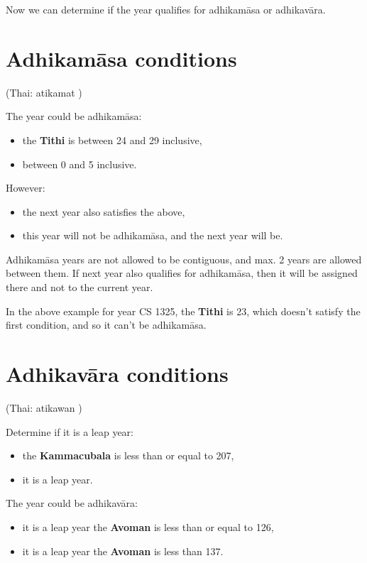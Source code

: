 \documentclass[11pt,oneside]{memoir-article}
\begin{document}
Now we can determine if the year qualifies for adhikamāsa or adhikavāra.

\section{Adhikamāsa conditions}
\label{sec-4-3}
\label{adhikamasa-years}

(Thai: atikamat )

The year could be adhikamāsa:

\begin{itemize}
\item {} the \textbf{Tithi} is between 24 and 29 inclusive,
\item {} between 0 and 5 inclusive.
\end{itemize}

However:

\begin{itemize}
\item {} the next year also satisfies the above,
\item {} this year will not be adhikamāsa, and the next year will be.
\end{itemize}

Adhikamāsa years are not allowed to be contiguous, and max. 2 years are allowed
between them. If next year also qualifies for adhikamāsa, then it will be
assigned there and not to the current year.

In the above example for year CS 1325, the \textbf{Tithi} is 23, which doesn't satisfy
the first condition, and so it can't be adhikamāsa.

\section{Adhikavāra conditions}
\label{sec-4-4}
\label{adhikavara-years}

(Thai: atikawan )

Determine if it is a leap year:

\begin{itemize}
\item {} the \textbf{Kammacubala} is less than or equal to 207,
\item {} it is a leap year.
\end{itemize}

The year could be adhikavāra:

\begin{itemize}
\item {} it is a leap year  the \textbf{Avoman} is less than or equal to 126,
\item {} it is  a leap year  the \textbf{Avoman} is less than 137.
\end{itemize}
\end{document}
